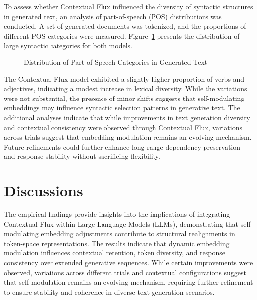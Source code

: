 \documentclass{article}
\begin{document}
To assess whether Contextual Flux influenced the diversity of syntactic structures in generated text, an analysis of part-of-speech (POS) distributions was conducted. A set of generated documents was tokenized, and the proportions of different POS categories were measured. Figure~\ref{fig:pos_variation} presents the distribution of large syntactic categories for both models.

\begin{figure}[h]
	\centering
	\caption{Distribution of Part-of-Speech Categories in Generated Text}
	\label{fig:pos_variation}
\end{figure}

The Contextual Flux model exhibited a slightly higher proportion of verbs and adjectives, indicating a modest increase in lexical diversity. While the variations were not substantial, the presence of minor shifts suggests that self-modulating embeddings may influence syntactic selection patterns in generative text. The additional analyses indicate that while improvements in text generation diversity and contextual consistency were observed through Contextual Flux, variations across trials suggest that embedding modulation remains an evolving mechanism. Future refinements could further enhance long-range dependency preservation and response stability without sacrificing flexibility.



\section{Discussions}

The empirical findings provide insights into the implications of integrating Contextual Flux within Large Language Models (LLMs), demonstrating that self-modulating embedding adjustments contribute to structural realignments in token-space representations. The results indicate that dynamic embedding modulation influences contextual retention, token diversity, and response consistency over extended generative sequences. While certain improvements were observed, variations across different trials and contextual configurations suggest that self-modulation remains an evolving mechanism, requiring further refinement to ensure stability and coherence in diverse text generation scenarios.
\end{document}
